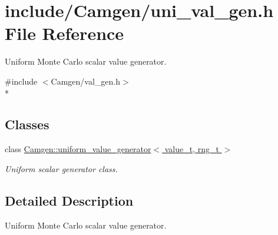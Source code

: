 \hypertarget{a00823}{}\section{include/\+Camgen/uni\+\_\+val\+\_\+gen.h File Reference}
\label{a00823}


Uniform Monte Carlo scalar value generator.  


{\ttfamily \#include $<$Camgen/val\+\_\+gen.\+h$>$}\\*
\subsection*{Classes}
\begin{DoxyCompactItemize}
\item 
class \hyperlink{a00570}{Camgen\+::uniform\+\_\+value\+\_\+generator$<$ value\+\_\+t, rng\+\_\+t $>$}
\begin{DoxyCompactList}\small\item\em Uniform scalar generator class. \end{DoxyCompactList}\end{DoxyCompactItemize}


\subsection{Detailed Description}
Uniform Monte Carlo scalar value generator. 

